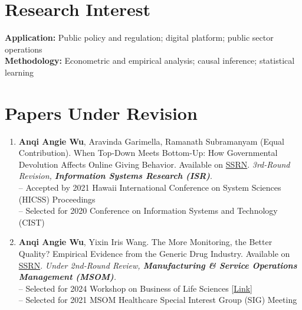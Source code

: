 \documentclass[margin,line]{resume}
\begin{document}
\begin{resume}

    \section{\mysidestyle Research Interest}
    \textbf{Application:} Public policy and regulation; digital platform; public sector operations\\
    \textbf{Methodology:} Econometric and empirical analysis; causal inference; statistical learning
    
    
 	  \section{\mysidestyle Papers Under Revision} 
 	  \begin{enumerate}[topsep=0pt, leftmargin=*]
 	  
 	   	 \item \textbf{Anqi Angie Wu}, Aravinda Garimella, Ramanath Subramanyam (Equal Contribution). When Top-Down Meets Bottom-Up: How Governmental Devolution Affects Online Giving Behavior. Available on \href{https://papers.ssrn.com/abstract=3779413}{{SSRN}}. \textit{3rd-Round Revision, \textbf{Information Systems Research (ISR)}}.\\	     [0.3em]
 	     -- Accepted by 2021 Hawaii International Conference on System Sciences (HICSS) Proceedings\\ 
 	     -- Selected for 2020 Conference on Information Systems and Technology (CIST) \\[-0.5em]
 	     
 	     \item \textbf{Anqi Angie Wu}, Yixin Iris Wang. The More Monitoring, the Better Quality? Empirical Evidence from the Generic Drug Industry. Available on \href{https://papers.ssrn.com/abstract=3596559}{{SSRN}}. \textit{Under 2nd-Round Review, \textbf{Manufacturing \& Service Operations Management (MSOM)}. }\\[0.3em]
         -- Selected for 2024 Workshop on Business of Life Sciences [\href{https://www.cblsblog.kelley.iu.edu/2024/03/04/inaugural-kelley-life-sciences-conference-brings-together-life-sciences-research-faculty-and-industry-leaders/?_gl=1*r7xewq*_ga*MTE1MjQ1OTA1MC4xNzA5MTM0NzE3*_ga_61CH0D2DQW*MTcwOTU4MTMzNi41LjEuMTcwOTU4MTc2NC42MC4wLjA.}{Link}]\\
          -- Selected for 2021 MSOM Healthcare Special Interest Group (SIG) Meeting\\
       [-0.5em]


\end{enumerate}
\end{resume}
\end{document}
